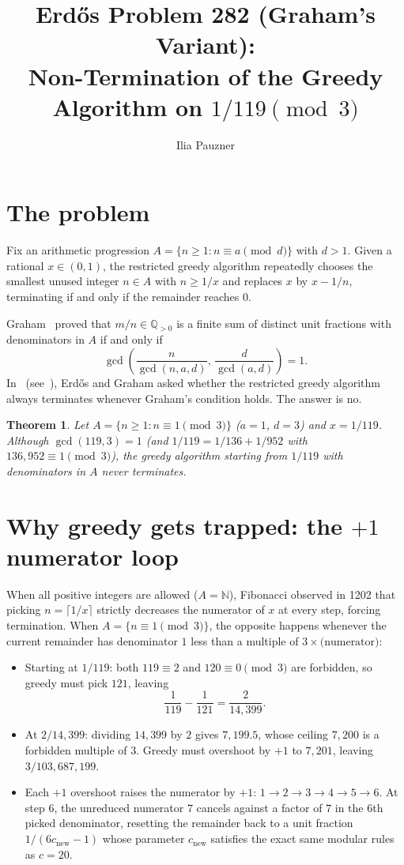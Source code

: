\documentclass[11pt,a4paper]{amsart}
\title[Erd\H{o}s Problem 282 (Graham's Variant)]{\texorpdfstring{Erd\H{o}s Problem 282 (Graham's Variant):\\ Non-Termination of the Greedy Algorithm on $1 / 119 \pmod{3}$}{Erdos Problem 282 (Graham's Variant): Non-Termination of the Greedy Algorithm on 1/119 (mod 3)}}
\author{Ilia Pauzner}
\date{}
\newtheorem*{theorem}{Theorem}
\theoremstyle{remark}
\begin{document}
\maketitle

\section{The problem}

Fix an arithmetic progression $A = \{n \ge 1 : n \equiv a \pmod{d}\}$ with $d > 1$. Given a rational $x \in (0, 1)$, the restricted greedy algorithm repeatedly chooses the smallest unused integer $n \in A$ with $n \ge 1 / x$ and replaces $x$ by $x - 1 / n$, terminating if and only if the remainder reaches $0$.

Graham~\cite{Gr64b} proved that $m / n \in \mathbb{Q}_{> 0}$ is a finite sum of distinct unit fractions with denominators in $A$ if and only if
\[
\gcd\!\left(\frac{n}{\gcd(n, a, d)},\, \frac{d}{\gcd(a, d)}\right) = 1.
\]
In~\cite[p.~31]{ErGr80} (see~\cite{EP282, FC282}), Erd\H{o}s and Graham asked whether the restricted greedy algorithm always terminates whenever Graham's condition holds. The answer is no.

\begin{theorem}
Let $A = \{n \ge 1 : n \equiv 1 \pmod{3}\}$ ($a = 1$, $d = 3$) and $x = 1 / 119$. Although $\gcd(119, 3) = 1$ (and $1 / 119 = 1 / 136 + 1 / 952$ with $136, 952 \equiv 1 \pmod{3}$), the greedy algorithm starting from $1 / 119$ with denominators in $A$ never terminates.
\end{theorem}

\section{\texorpdfstring{Why greedy gets trapped: the $+1$ numerator loop}{Why greedy gets trapped: the +1 numerator loop}}

When all positive integers are allowed ($A = \mathbb{N}$), Fibonacci observed in 1202 that picking $n = \lceil 1 / x \rceil$ strictly decreases the numerator of $x$ at every step, forcing termination. When $A = \{n \equiv 1 \pmod{3}\}$, the opposite happens whenever the current remainder has denominator $1$ less than a multiple of $3 \times \text{(numerator)}$:
\begin{itemize}
\item Starting at $1 / 119$: both $119 \equiv 2$ and $120 \equiv 0 \pmod{3}$ are forbidden, so greedy must pick $121$, leaving
\[
\frac{1}{119} - \frac{1}{121} = \frac{2}{14{,}399}.
\]
\item At $2 / 14{,}399$: dividing $14{,}399$ by $2$ gives $7{,}199.5$, whose ceiling $7{,}200$ is a forbidden multiple of $3$. Greedy must overshoot by $+1$ to $7{,}201$, leaving $3 / 103{,}687{,}199$.
\item Each $+1$ overshoot raises the numerator by $+1$: $1 \to 2 \to 3 \to 4 \to 5 \to 6$. At step $6$, the unreduced numerator $7$ cancels against a factor of $7$ in the $6$th picked denominator, resetting the remainder back to a unit fraction $1 / (6 c_{\mathrm{new}} - 1)$ whose parameter $c_{\mathrm{new}}$ satisfies the exact same modular rules as $c = 20$.
\end{itemize}
\end{document}
